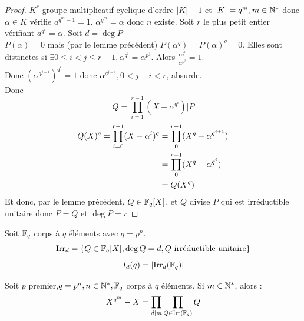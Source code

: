 \documentclass[]{report}
\begin{document}
    \begin{proof}
        $K^*$ groupe multiplicatif cyclique d'ordre $|K|-1$ et $|K|=q^m,m\in\mathbb{N}^*$ donc $\alpha\in K$ vérifie $a^{q^m-1}=1$. $\alpha^{q^m}=\alpha$ donc $n$ existe. Soit $r$ le plus petit entier vérifiant $a^{q^r}=\alpha$. Soit $d=\deg P$\\
        $P(\alpha)=0$ mais (par le lemme précédent) $P(\alpha^q)=P(\alpha)^q=0$. Elles sont distinctes si $\exists 0\le i < j \le r-1,\alpha^{q^i}=\alpha^{p^j}$. Alors $\frac{\alpha^{q^i}}{\alpha^{p^j}}=1$.\\
        Donc $(\alpha^{q^{j-i}})^{q^i}=1$ donc $\alpha^{q^{j-i}},0<j-i<r$, absurde.\\        Donc \[Q=\prod_{i=1}^{r-1}(X-\alpha^{q^i})|P\]
        \begin{align*}Q(X)^q=\prod_{i=0}^{r-1}(X- \alpha^i)^q &=\prod_{0}^{r-1}(X^q-\alpha^{q^{i+1}})\\
        &=\prod_{0}^{r-1}(X^q-\alpha^{q^i})\\
        &=Q(X^q)\end{align*}
        Et donc, par le lemme précédent, $Q\in\mathbb{F}_q[X]$. et $Q$ divise $P$ qui est irréductible unitaire donc $P=Q$ et $\deg P=r$
    \end{proof}

    \begin{nt}{}{}
        Soit $\mathbb{F}_q$ corps à $q$ éléments avec $q=p^n$.\\
        \[\text{Irr}_d=\{Q\in\mathbb{F}_q[X],\deg Q=d,Q\text{ irréductible unitaire}\}\]
        \[I_d (q)=|\text{Irr}_d(\mathbb{F}_q)|\]
    \end{nt}

    \begin{tm}{}{}
        Soit $p$ premier,$q=p^n,n\in\mathbb{N}^*,\mathbb{F}_q$ corps à $q$ éléments. Si $m\in\mathbb{N}^*$, alors :
        \[X^{q^m}-X=\prod_{d|m}\prod_{Q\in\text{Irr}(\mathbb{F}_q)}Q\]
    \end{tm}
\end{document}
